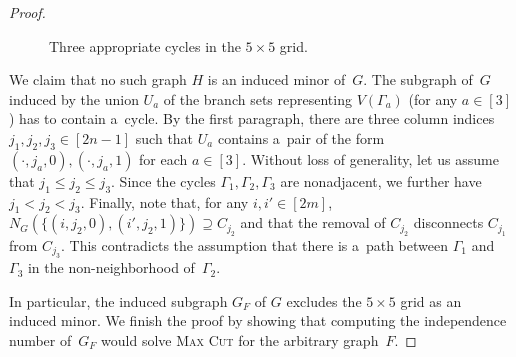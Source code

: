 \documentclass[a4paper,UKenglish,cleveref,autoref]{lipics-v2021}
\begin{document}
\begin{proof}
\begin{claimproof}
\begin{figure}[!ht]
\caption{Three appropriate cycles in the $5 \times 5$ grid.}
\label{fig:grid-three-cycles}
\end{figure}
    
\leavevmode
We claim that no such graph $H$ is an induced minor of~$G$.
\leavevmode
The subgraph of~$G$ induced by the union $U_a$ of the branch sets representing $V(\Gamma_a)$ (for any $a \in [3]$) has to contain a~cycle. 
    By the first paragraph, there are three column indices $j_1, j_2, j_3 \in [2n-1]$ such that $U_a$ contains a~pair of the form $(\cdot,j_a,0), (\cdot,j_a,1)$ for each $a \in [3]$.
    Without loss of generality, let us assume that $j_1 \leqslant j_2 \leqslant j_3$.
    Since the cycles $\Gamma_1, \Gamma_2, \Gamma_3$ are nonadjacent, we further have $j_1 < j_2 < j_3$.
    Finally, note that, for any $i,i' \in [2m]$, $N_G(\{(i,j_2,0), (i',j_2,1)\}) \supseteq C_{j_2}$ and that the removal of $C_{j_2}$ disconnects $C_{j_1}$ from $C_{j_3}$.
    This contradicts the assumption that there is a~path between $\Gamma_1$ and $\Gamma_3$ in the non-neighborhood of~$\Gamma_2$.
\claimqedhere
  \end{claimproof}
\leavevmode
In particular, the induced subgraph $G_F$ of $G$ excludes the $5 \times 5$ grid as an induced minor.
  We finish the proof by showing that computing the independence number of~$G_F$ would solve \textsc{Max Cut} for the arbitrary graph~$F$.
  

\end{proof}
\end{document}
